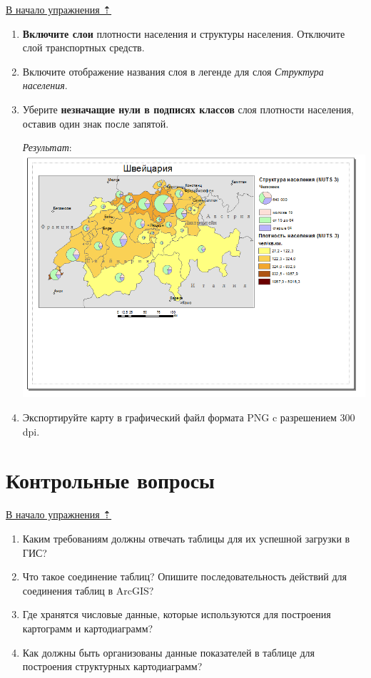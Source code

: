 \documentclass[]{book}
\theoremstyle{definition}
\theoremstyle{definition}
\theoremstyle{definition}
\theoremstyle{remark}
\begin{document}
\protect\hyperlink{stat-map-economic}{В начало упражнения ⇡}

\begin{enumerate}
\def\labelenumi{\arabic{enumi}.}
\item
  \textbf{Включите слои} плотности населения и структуры населения.
  Отключите слой транспортных средств.
\item
  Включите отображение названия слоя в легенде для слоя \emph{Структура
  населения}.
\item
  Уберите \textbf{незначащие нули в подписях классов} слоя плотности
  населения, оставив один знак после запятой.

  \emph{Результат}: \includegraphics{images/Ex08/image34.png}
\item
  Экспортируйте карту в графический файл формата PNG c разрешением 300
  dpi.
\end{enumerate}

\hypertarget{stat-map-economic-export-questions}{%
\section{Контрольные вопросы}\label{stat-map-economic-export-questions}}

\protect\hyperlink{stat-map-economic}{В начало упражнения ⇡}

\begin{enumerate}
\def\labelenumi{\arabic{enumi}.}
\item
  Каким требованиям должны отвечать таблицы для их успешной загрузки в
  ГИС?
\item
  Что такое соединение таблиц? Опишите последовательность действий для
  соединения таблиц в ArcGIS?
\item
  Где хранятся числовые данные, которые используются для построения
  картограмм и картодиаграмм?
\item
  Как должны быть организованы данные показателей в таблице для
  построения структурных картодиаграмм?
\end{enumerate}
\end{document}
